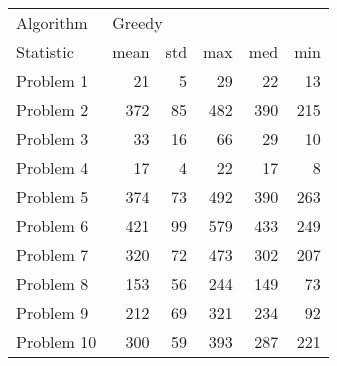 \begin{tabular}{lrrrrr}
\toprule
Algorithm & \multicolumn{5}{l}{Greedy} \\
Statistic &   mean & std &  max &  med &  min \\
\midrule
Problem 1  &     21 &   5 &   29 &   22 &   13 \\
Problem 2  &    372 &  85 &  482 &  390 &  215 \\
Problem 3  &     33 &  16 &   66 &   29 &   10 \\
Problem 4  &     17 &   4 &   22 &   17 &    8 \\
Problem 5  &    374 &  73 &  492 &  390 &  263 \\
Problem 6  &    421 &  99 &  579 &  433 &  249 \\
Problem 7  &    320 &  72 &  473 &  302 &  207 \\
Problem 8  &    153 &  56 &  244 &  149 &   73 \\
Problem 9  &    212 &  69 &  321 &  234 &   92 \\
Problem 10 &    300 &  59 &  393 &  287 &  221 \\
\bottomrule
\end{tabular}

